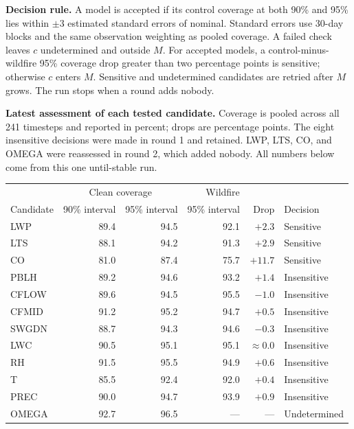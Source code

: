 \documentclass[11pt]{article}
\begin{document}
\textbf{Decision rule.}
A model is accepted if its control coverage at both 90\% and 95\% lies within
$\pm3$ estimated standard errors of nominal. Standard errors use 30-day blocks
and the same observation weighting as pooled coverage. A failed check leaves
$c$ undetermined and outside $M$. For accepted models, a control-minus-wildfire
95\% coverage drop greater than two percentage points is sensitive; otherwise
$c$ enters $M$. Sensitive and undetermined candidates are retried after $M$ grows.
The run stops when a round adds nobody.

\newpage
\textbf{Latest assessment of each tested candidate.}
Coverage is pooled across all 241 timesteps and reported in percent; drops are
percentage points. The eight insensitive decisions were made in round 1 and
retained. LWP, LTS, CO, and OMEGA were reassessed in round 2, which added nobody.
All numbers below come from this one until-stable run.

\begin{center}
\small
\begin{tabular}{lrrrrl}
\toprule
 & \multicolumn{2}{c}{Clean coverage} & Wildfire & & \\
Candidate & 90\% interval & 95\% interval & 95\% interval & Drop & Decision \\
\midrule
LWP   & 89.4 & 94.5 & 92.1 & $+2.3$ & Sensitive \\
LTS   & 88.1 & 94.2 & 91.3 & $+2.9$ & Sensitive \\
CO    & 81.0 & 87.4 & 75.7 & $+11.7$ & Sensitive \\
\midrule
PBLH  & 89.2 & 94.6 & 93.2 & $+1.4$ & Insensitive \\
CFLOW & 89.6 & 94.5 & 95.5 & $-1.0$ & Insensitive \\
CFMID & 91.2 & 95.2 & 94.7 & $+0.5$ & Insensitive \\
SWGDN & 88.7 & 94.3 & 94.6 & $-0.3$ & Insensitive \\
LWC   & 90.5 & 95.1 & 95.1 & $\approx0.0$ & Insensitive \\
RH    & 91.5 & 95.5 & 94.9 & $+0.6$ & Insensitive \\
T     & 85.5 & 92.4 & 92.0 & $+0.4$ & Insensitive \\
PREC  & 90.0 & 94.7 & 93.9 & $+0.9$ & Insensitive \\
\midrule
OMEGA & 92.7 & 96.5 & --- & --- & Undetermined \\
\bottomrule
\end{tabular}
\end{center}
\end{document}
